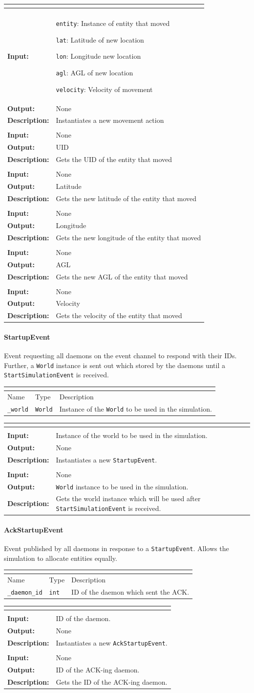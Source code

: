 \documentclass[titlepage]{article}
\renewenvironment{itemize*}
    {\begin{itemize}
        \setlength{\itemsep}{0pt}%
        \setlength{\parskip}{0pt}%
        \setlength{\partopsep}{0pt}%
        \setlength{\topsep}{0pt}}%
    {\end{itemize}}
\newcommand{\operations}[1]{
\begin{center}
    \begin{longtable}{|p{4cm}|p{10cm + 2.0\tabcolsep}|}
    \hline
    \multicolumn{2}{|l|}{\cellcolor[gray]{0.5}{\textbf{Operations}}} \\ \hline
#1
    \end{longtable}
\end{center}
}
\newcommand{\operation}[4]{
    \hline
    \multicolumn{2}{|l|}{\cellcolor[gray]{0.8}{\texttt{#1}}} \\ \hline
    \hspace{7pt}\textbf{Input:} & #2 \\ \hline
    \hspace{7pt}\textbf{Output:} & #3 \\ \hline
    \hspace{7pt}\textbf{Description:} & #4 \\ \hline
}
\newcommand{\attributes}[1]{
    \begin{center}
        \begin{tabular}{|p{3.5cm}|p{3.5cm}|p{7cm}|}
            \multicolumn{3}{|l|}{\cellcolor[gray]{0.5}{\textbf{Attributes}}} \\ \hline
            \rowcolor[gray]{0.8} Name & Type & Description \\ \hline 
            #1
        \end{tabular}
    \end{center}
}
\newcommand{\attribute}[3]{
    \texttt{#1} & \texttt{#2} & #3 \\ \hline
}
\begin{document}
\operations
{
    \operation{\_\_init\_\_(entity, lat, lon, agl, velocity)}
    {
        \begin{itemize*}
            \item \texttt{entity}: Instance of entity that moved
            \item \texttt{lat}: Latitude of new location
            \item \texttt{lon}: Longitude new location
            \item \texttt{agl}: AGL of new location
            \item \texttt{velocity}: Velocity of movement
        \end{itemize*}
    }{None}{Instantiates a new movement action}
    \operation{get\_uid()}{None}{UID}{Gets the UID of the entity that moved}
    \operation{get\_lat()}{None}{Latitude}{Gets the new latitude of the entity that moved}
    \operation{get\_lon()}{None}{Longitude}{Gets the new longitude of the entity that moved}
    \operation{get\_agl()}{None}{AGL}{Gets the new AGL of the entity that moved}
    \operation{get\_velocity()}{None}{Velocity}{Gets the velocity of the entity that moved}
}

\paragraph{StartupEvent}{Event requesting all daemons on the event channel to respond with their IDs.  Further, a \texttt{World} instance is sent out which stored by the daemons until a \texttt{StartSimulationEvent} is received.}
\attributes
{
    \attribute{\_world}{World}{Instance of the \texttt{World} to be used in the simulation.}
}

\operations
{
    \operation{\_\_init\_\_(world)}{Instance of the world to be used in the simulation.}{None}{Instantiates a new \texttt{StartupEvent}.}
    \operation{get\_world()}{None}{\texttt{World} instance to be used in the simulation.}{Gets the world instance which will be used after \texttt{StartSimulationEvent} is received.}
}

\paragraph{AckStartupEvent}{Event published by all daemons in response to a \texttt{StartupEvent}.  Allows the simulation to allocate entities equally.}
\attributes
{
    \attribute{\_daemon\_id}{int}{ID of the daemon which sent the ACK.}
}

\operations
{
    \operation{\_\_init\_\_(daemon\_id)}{ID of the daemon.}{None}{Instantiates a new \texttt{AckStartupEvent}.}
    \operation{get\_daemon\_id()}{None}{ID of the ACK-ing daemon.}{Gets the ID of the ACK-ing daemon.}
}
\end{document}
